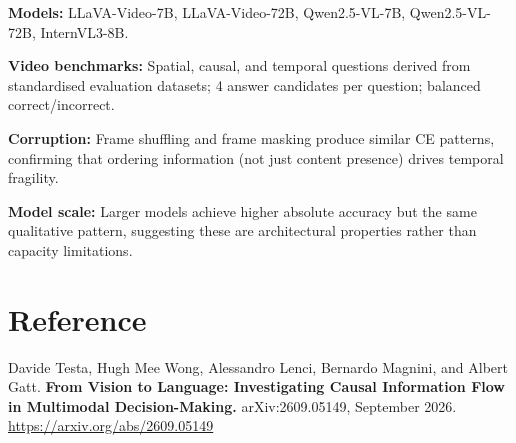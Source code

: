 \documentclass[10pt,twocolumn]{article}
\begin{document}
\textbf{Models:} LLaVA-Video-7B, LLaVA-Video-72B, Qwen2.5-VL-7B,
Qwen2.5-VL-72B, InternVL3-8B.

\textbf{Video benchmarks:} Spatial, causal, and temporal questions
derived from standardised evaluation datasets; 4 answer candidates per
question; balanced correct/incorrect.

\textbf{Corruption:} Frame shuffling and frame masking produce similar
CE patterns, confirming that ordering information (not just content
presence) drives temporal fragility.

\textbf{Model scale:} Larger models achieve higher absolute accuracy but
the same qualitative pattern, suggesting these are architectural
properties rather than capacity limitations.

\section*{Reference}

Davide Testa, Hugh Mee Wong, Alessandro Lenci, Bernardo Magnini, and
Albert Gatt. \textbf{From Vision to Language: Investigating Causal
Information Flow in Multimodal Decision-Making.}
arXiv:2609.05149, September 2026.
\url{https://arxiv.org/abs/2609.05149}
\end{document}
